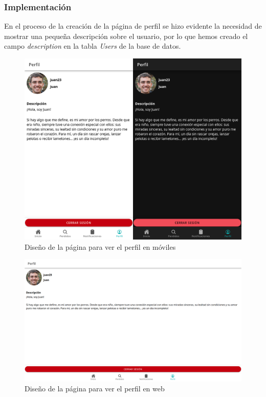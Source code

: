 \subsubsection{Implementación}

En el proceso de la creación de la página de perfil se hizo evidente la necesidad de mostrar una pequeña descripción sobre el usuario, por lo que hemos creado el campo \textit{description} en la tabla \textit{Users} de la base de datos.

\begin{figure} [H]
	\centering
	\includegraphics[width=1\linewidth]{sprint 3//hu11-12/implementacion.png}
	\caption{Diseño de la página para ver el perfil en móviles}
	\label{fig:impPerfil}
\end{figure}

\begin{figure}[H]
	\centering
	\includegraphics[width=1\linewidth]{sprint 3//hu11-12/implementacionWeb.png}
	\caption{Diseño de la página para ver el perfil en web}
\end{figure}

